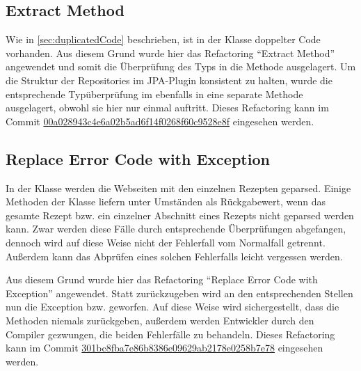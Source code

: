 \subsection{Extract Method}
Wie in \autoref{sec:duplicatedCode} beschrieben, ist in der Klasse  doppelter Code vorhanden. Aus diesem Grund wurde hier das Refactoring \enquote{Extract Method} angewendet und somit die Überprüfung des Typs in die Methode \href{https://github.com/anditru/quickie/blob/d39394fa4590c1fd7fadc7974ee37c5416c0fc93/0-quickie-plugin-jpa/src/main/java/org/pinkcrazyunicorn/quickie/plugins/jpa/JPAProfileRepository.java#L81}{} ausgelagert. Um die Struktur der Repositories im JPA-Plugin konsistent zu halten, wurde die entsprechende Typüberprüfung im \href{https://github.com/anditru/quickie/blob/master/0-quickie-plugin-jpa/src/main/java/org/pinkcrazyunicorn/quickie/plugins/jpa/JPAProfileRepository.java}{} ebenfalls in eine separate Methode ausgelagert, obwohl sie hier nur einmal auftritt. Dieses Refactoring kann im Commit \href{https://github.com/anditru/quickie/commit/00a028943c4e6a02b5ad6f14f0268f60c9528e8f}{00a028943c4e6a02b5ad6f14f0268f60c9528e8f} eingesehen werden.

\subsection{Replace Error Code with Exception}
In der Klasse  werden die Webseiten mit den einzelnen Rezepten geparsed. Einige Methoden der Klasse liefern unter Umständen  als Rückgabewert, wenn das gesamte Rezept bzw. ein einzelner Abschnitt eines Rezepts nicht geparsed werden kann. Zwar werden diese Fälle durch entsprechende Überprüfungen abgefangen, dennoch wird auf diese Weise nicht der Fehlerfall vom Normalfall getrennt. Außerdem kann das Abprüfen eines solchen Fehlerfalls leicht vergessen werden.

Aus diesem Grund wurde hier das Refactoring \enquote{Replace Error Code with Exception} angewendet. Statt  zurückzugeben wird an den entsprechenden Stellen nun die Exception \href{https://github.com/anditru/quickie/blob/d39394fa4590c1fd7fadc7974ee37c5416c0fc93/0-quickie-plugin-scraper/src/main/java/org/pinkcrazyunicorn/quickie/plugins/scraper/exceptions/FailedToParseRecipe.java}{} bzw. \href{https://github.com/anditru/quickie/blob/d39394fa4590c1fd7fadc7974ee37c5416c0fc93/0-quickie-plugin-scraper/src/main/java/org/pinkcrazyunicorn/quickie/plugins/scraper/exceptions/FailedToParseIngredient.java}{} geworfen. Auf diese Weise wird sichergestellt, dass die Methoden niemals  zurückgeben, außerdem werden Entwickler durch den Compiler gezwungen, die beiden Fehlerfälle zu behandeln. Dieses Refactoring kann im Commit \href{https://github.com/anditru/quickie/commit/301bc8fba7e86b8386e09629ab2178e0258b7e78}{301bc8fba7e86b8386e09629ab2178e0258b7e78} eingesehen werden.
